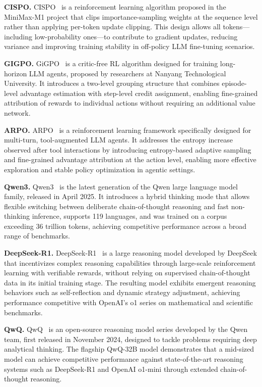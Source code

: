 \documentclass{article}
\begin{document}
\noindent\textbf{CISPO.} CISPO~\cite{chen2025minimax} is a reinforcement learning algorithm proposed in the MiniMax-M1 project that clips importance-sampling weights at the sequence level rather than applying per-token update clipping. This design allows all tokens—including low-probability ones—to contribute to gradient updates, reducing variance and improving training stability in off-policy LLM fine-tuning scenarios.

\noindent\textbf{GIGPO.} GiGPO~\cite{feng2025group} is a critic-free RL algorithm designed for training long-horizon LLM agents, proposed by researchers at Nanyang Technological University. It introduces a two-level grouping structure that combines episode-level advantage estimation with step-level credit assignment, enabling fine-grained attribution of rewards to individual actions without requiring an additional value network.
 

\noindent\textbf{ARPO.} ARPO~\cite{dong2025agentic} is a reinforcement learning framework specifically designed for multi-turn, tool-augmented LLM agents. It addresses the entropy increase observed after tool interactions by introducing entropy-based adaptive sampling and fine-grained advantage attribution at the action level, enabling more effective exploration and stable policy optimization in agentic settings.

\noindent\textbf{Qwen3.} Qwen3~\cite{yang2025qwen3} is the latest generation of the Qwen large language model family, released in April 2025. It introduces a hybrid thinking mode that allows flexible switching between deliberate chain-of-thought reasoning and fast non-thinking inference, supports 119 languages, and was trained on a corpus exceeding 36 trillion tokens, achieving competitive performance across a broad range of benchmarks.

\noindent\textbf{DeepSeek-R1.} DeepSeek-R1~\cite{guo2025deepseek} is a large reasoning model developed by DeepSeek that incentivizes complex reasoning capabilities through large-scale reinforcement learning with verifiable rewards, without relying on supervised chain-of-thought data in its initial training stage. The resulting model exhibits emergent reasoning behaviors such as self-reflection and dynamic strategy adjustment, achieving performance competitive with OpenAI's o1 series on mathematical and scientific benchmarks.

\noindent\textbf{QwQ.} QwQ~\cite{team2024qwq} is an open-source reasoning model series developed by the Qwen team, first released in November 2024, designed to tackle problems requiring deep analytical thinking. The flagship QwQ-32B model demonstrates that a mid-sized model can achieve competitive performance against state-of-the-art reasoning systems such as DeepSeek-R1 and OpenAI o1-mini through extended chain-of-thought reasoning.
\end{document}
